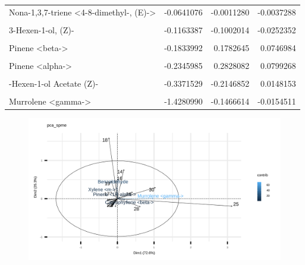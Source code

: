 \documentclass{ufdissertation}[overrideChapters] %
\begin{document}
{\begin{table}
{\begin{tabular}[t]{lrrr}
Nona-1,3,7-triene <4-8-dimethyl-, (E)-> & -0.0641076 & -0.0011280 & -0.0037288\\
\cellcolor{gray!6}{Cadinene <delta->} & \cellcolor{gray!6}{-0.0706630} & \cellcolor{gray!6}{-0.0334461} & \cellcolor{gray!6}{-0.0287334}\\
3-Hexen-1-ol, (Z)- & -0.1163387 & -0.1002014 & -0.0252352\\
\addlinespace
\cellcolor{gray!6}{Germacrene D} & \cellcolor{gray!6}{-0.1453546} & \cellcolor{gray!6}{0.0133377} & \cellcolor{gray!6}{-0.0014412}\\
Pinene <beta-> & -0.1833992 & 0.1782645 & 0.0746984\\
\cellcolor{gray!6}{Ocimene, <beta->} & \cellcolor{gray!6}{-0.2287973} & \cellcolor{gray!6}{0.3568309} & \cellcolor{gray!6}{0.1167148}\\
Pinene <alpha-> & -0.2345985 & 0.2828082 & 0.0799268\\
\cellcolor{gray!6}{Farnesene <(E,E)-, alpha->} & \cellcolor{gray!6}{-0.2452920} & \cellcolor{gray!6}{0.0848936} & \cellcolor{gray!6}{0.0702475}\\
\addlinespace
3-Hexen-1-ol Acetate (Z)- & -0.3371529 & -0.2146852 & 0.0148153\\
\cellcolor{gray!6}{Caryophyllene <beta->} & \cellcolor{gray!6}{-0.5626760} & \cellcolor{gray!6}{0.2589637} & \cellcolor{gray!6}{0.0807489}\\
Murrolene <gamma-> & -1.4280990 & -0.1466614 & -0.0154511\\
\bottomrule
\end{tabular}}
\end{table}
\begin{figure}

{\centering \includegraphics[width=1\linewidth]{figure/rrv_volatiles_biplot_var_pca_spme} 

}
\end{figure}}
\end{document}
